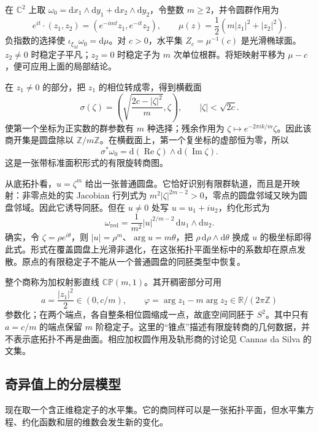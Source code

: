 \begin{example}\label{g4:exm:1004:weighted-projective-chart}
	在 \(\mathbb C^2\) 上取 \(\omega_0=\mathrm{d}x_1\wedge\mathrm{d}y_1+\mathrm{d}x_2\wedge\mathrm{d}y_2\)，令整数 \(m\ge2\)，并令圆群作用为
	\[
		e^{it}\cdot(z_1,z_2)=(e^{-imt}z_1,e^{-it}z_2),
		\qquad \mu(z)=\frac12(m|z_1|^2+|z_2|^2).
	\]
	负指数的选择使 \(\iota_{\xi_M}\omega_0=\mathrm{d}\mu\)。对 \(c>0\)，水平集 \(Z_c=\mu^{-1}(c)\) 是光滑椭球面。\(z_2\neq0\) 时稳定子平凡；\(z_2=0\) 时稳定子为 \(m\) 次单位根群。将矩映射平移为 \(\mu-c\)，便可应用上面的局部结论。

	在 \(z_1\neq0\) 的部分，把 \(z_1\) 的相位转成零，得到横截面
	\[
		\sigma(\zeta)=\left(\sqrt{\frac{2c-|\zeta|^2}{m}},\zeta\right),
		\qquad |\zeta|<\sqrt{2c}.
	\]
	使第一个坐标为正实数的群参数有 \(m\) 种选择；残余作用为 \(\zeta\mapsto e^{-2\pi i k/m}\zeta\)。因此该商开集是圆盘除以 \(\mathbb Z/m\mathbb Z\)。在横截面上，第一个复坐标的虚部恒为零，所以
	\[
		\sigma^*\omega_0=\mathrm{d}(\operatorname{Re}\zeta)\wedge\mathrm{d}(\operatorname{Im}\zeta).
	\]
	这是一张带标准面积形式的有限旋转商图。

	从底拓扑看，\(u=\zeta^m\) 给出一张普通圆盘。它恰好识别有限群轨道，而且是开映射：非零点处的实 Jacobian 行列式为 \(m^2|\zeta|^{2m-2}>0\)，零点的圆盘邻域又映为圆盘邻域。因此它诱导同胚。但在 \(u\neq0\) 处写 \(u=u_1+iu_2\)，约化形式为
	\begin{equation}\label{g4:eq:1004:orbifold-area}
		\omega_{\mathrm{red}}
		=\frac1{m^2}|u|^{2/m-2}\,\mathrm{d}u_1\wedge\mathrm{d}u_2.
	\end{equation}
	确实，令 \(\zeta=\rho e^{i\theta}\)，则 \(|u|=\rho^m\)、\(\arg u=m\theta\)，把 \(\rho\,\mathrm{d}\rho\wedge\mathrm{d}\theta\) 换成 \(u\) 的极坐标即得此式。形式在覆盖圆盘上光滑非退化，在这张拓扑平面坐标中的系数却在原点发散。原点的有限稳定子不能从一个普通圆盘的同胚类型中恢复。

	整个商称为加权射影直线 \(\mathbb{CP}(m,1)\)。其开稠密部分可用
	\[
		a=\frac{|z_1|^2}{2}\in(0,c/m),
		\qquad \varphi=\arg z_1-m\arg z_2\in\mathbb R/(2\pi\mathbb Z)
	\]
	参数化；在两个端点，各自整条相位圆缩成一点，故底空间同胚于 \(S^2\)。其中只有 \(a=c/m\) 的端点保留 \(m\) 阶稳定子。这里的“锥点”描述有限旋转商的几何数据，并不表示底拓扑不再是曲面。相应加权圆作用及轨形商的讨论见 Cannas da Silva 的文集。\cite[第6.2节，第164--165页]{Cannas2006Symplectic}
\end{example}

\subsection{奇异值上的分层模型}
\label{g4:subsec:1004:02}
现在取一个含正维稳定子的水平集。它的商同样可以是一张拓扑平面，但水平集方程、约化函数和层的维数会发生新的变化。

